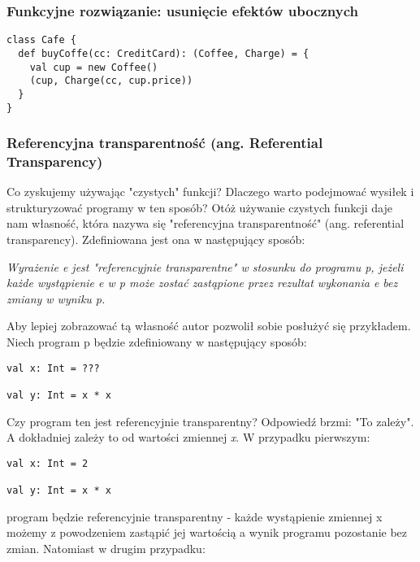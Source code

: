 \documentclass[../main.tex]{subfiles}
\begin{document}
\subsubsection{Funkcyjne rozwiązanie: usunięcie efektów ubocznych}
\begin{lstlisting}
class Cafe { 
  def buyCoffe(cc: CreditCard): (Coffee, Charge) = {
    val cup = new Coffee()
    (cup, Charge(cc, cup.price))
  }
}
\end{lstlisting}



\subsubsection{Referencyjna transparentność (ang. Referential Transparency)}
Co zyskujemy używając "czystych" funkcji? Dlaczego warto podejmować wysiłek i strukturyzować programy w ten sposób? Otóż używanie czystych funkcji daje nam własność, która nazywa się "referencyjna transparentność" (ang. referential transparency).
Zdefiniowana jest ona w następujący sposób:
\begin{center}
\textit{Wyrażenie e jest "referencyjnie transparentne" w stosunku do programu p, jeżeli każde wystąpienie e w p może zostać zastąpione przez rezultat wykonania e bez zmiany w wyniku p.} \cite{BOOK:FPinScala} 
\end{center}
Aby lepiej zobrazować tą własność autor pozwolił sobie posłużyć się przykładem.
Niech program p będzie zdefiniowany w następujący sposób:
\begin{lstlisting}[caption=Przykładowy program w języku Scala.]
val x: Int = ???

val y: Int = x * x
\end{lstlisting}
Czy program ten jest referencyjnie transparentny? Odpowiedź brzmi: "To zależy". A dokładniej zależy to od wartości zmiennej \textit{x}. W przypadku pierwszym:
\begin{lstlisting}[caption=Referencyjnie transparentny program.]
val x: Int = 2

val y: Int = x * x
\end{lstlisting}
program będzie referencyjnie transparentny - każde wystąpienie zmiennej x możemy z powodzeniem zastąpić jej wartością a wynik programu pozostanie bez zmian.
Natomiast w drugim przypadku:
\end{document}
